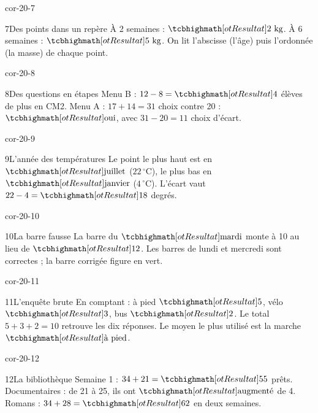 \begin{blocLivre}{cor-20-7}\begin{corrige}{7}{Des points dans un repère}
À 2 semaines : $\res{2\ \mathrm{kg}}$. À 6 semaines : $\res{5\ \mathrm{kg}}$. On lit l’abscisse (l’âge) puis l’ordonnée (la masse) de chaque point.
\label{fig-cor-20-7}
\end{corrige}\end{blocLivre}
\begin{blocLivre}{cor-20-8}\begin{corrige}{8}{Des questions en étapes}
Menu B : $12-8=\res4$ élèves de plus en CM2. Menu A : $17+14=31$ choix contre 20 : $\res{\text{oui}}$, avec $31-20=11$ choix d’écart.
\end{corrige}\end{blocLivre}
\begin{blocLivre}{cor-20-9}\begin{corrige}{9}{L’année des températures}
Le point le plus haut est en $\res{\text{juillet}}$ ($22\,^\circ$C), le plus bas en $\res{\text{janvier}}$ ($4\,^\circ$C). L’écart vaut $22-4=\res{18}$ degrés.
\label{fig-cor-20-9}
\end{corrige}\end{blocLivre}
\begin{blocLivre}{cor-20-10}\begin{corrige}{10}{La barre fausse}
La barre du $\res{\text{mardi}}$ monte à 10 au lieu de $\res{12}$. Les barres de lundi et mercredi sont correctes ; la barre corrigée figure en vert.
\label{fig-cor-20-10}
\end{corrige}\end{blocLivre}
\begin{blocLivre}{cor-20-11}\begin{corrige}{11}{L’enquête brute}
En comptant : à pied $\res5$, vélo $\res3$, bus $\res2$. Le total $5+3+2=10$ retrouve les dix réponses. Le moyen le plus utilisé est la marche $\res{\text{à pied}}$.
\end{corrige}\end{blocLivre}
\begin{blocLivre}{cor-20-12}\begin{corrige}{12}{La bibliothèque}
Semaine 1 : $34+21=\res{55}$ prêts. Documentaires : de 21 à 25, ils ont $\res{\text{augmenté}}$ de 4. Romans : $34+28=\res{62}$ en deux semaines.
\end{corrige}\end{blocLivre}
